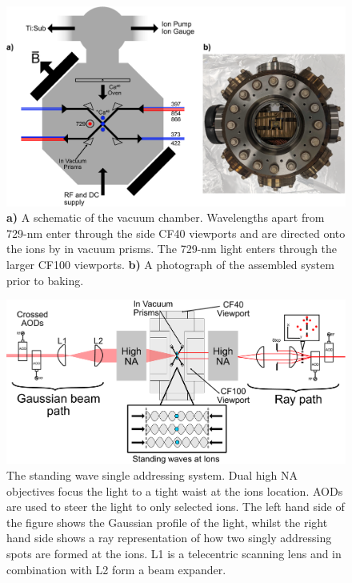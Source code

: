 \begin{figure}
  \begin{center}
   \noindent\includegraphics[width=0.9\linewidth]{figures/pdf_figure/vacuum_can-crop.pdf}
  \end{center}
  \caption{
    \textbf{a)}  A schematic of the vacuum chamber.
    Wavelengths apart from 729-nm enter through the side CF40 viewports and are
    directed onto the ions by in vacuum prisms. The 729-nm light enters through
    the larger CF100 viewports.  \textbf{b)} A photograph of the assembled
    system prior to baking.
  }
  \label{fig:can}
\end{figure}


\begin{figure}
  \begin{center}
   \noindent\includegraphics[width=\linewidth]{figures/pdf_figure/vac_can_AOD_small.pdf}
  \end{center}
  \caption{ The standing wave single addressing system. Dual high NA
    objectives focus the light to a tight waist at the ions
    location. AODs are used to steer the light to only selected
    ions. The left hand side of the figure shows the Gaussian profile
    of the light, whilst the right hand side shows a ray
    representation of how two singly addressing spots are formed at
    the ions. L1 is a telecentric scanning lens and in combination
    with L2 form a beam expander.}
  \label{fig:AOD}
\end{figure}

